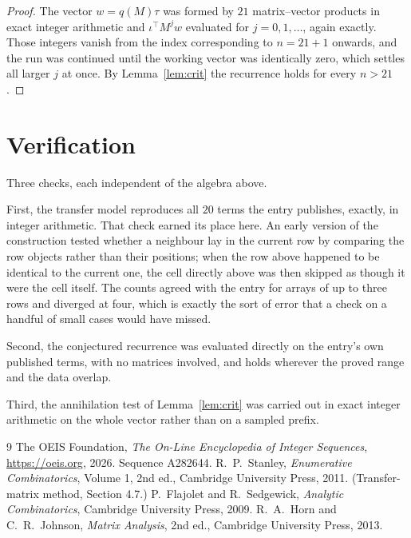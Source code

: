 \documentclass[11pt,a4paper]{article}
\theoremstyle{plain}
\theoremstyle{definition}
\begin{document}
\begin{proof}
The vector $w=q(M)\tau$ was formed by $21$ matrix--vector products in exact integer
arithmetic and $\iota^{\!\top}M^{j}w$ evaluated for $j=0,1,\dots$, again exactly. Those
integers vanish from the index corresponding to $n=21+1$ onwards, and the run was
continued until the working vector was identically zero, which settles all larger $j$ at once.
By Lemma~\ref{lem:crit} the recurrence holds for every $n>21$.
\end{proof}

\section{Verification}

Three checks, each independent of the algebra above.

First, the transfer model reproduces all $20$ terms the entry publishes, exactly, in
integer arithmetic. That check earned its place here. An early version of the construction
tested whether a neighbour lay in the current row by comparing the row objects rather
than their positions; when the row above happened to be identical to the current one, the
cell directly above was then skipped as though it were the cell itself. The counts agreed with
the entry for arrays of up to three rows and diverged at four, which is exactly the sort of
error that a check on a handful of small cases would have missed.

Second, the conjectured recurrence was evaluated directly on the entry's own published terms,
with no matrices involved, and holds wherever the proved range and the data overlap.

Third, the annihilation test of Lemma~\ref{lem:crit} was carried out in exact integer
arithmetic on the whole vector rather than on a sampled prefix.

\begin{thebibliography}{9}
 The OEIS Foundation, \emph{The On-Line Encyclopedia of Integer
Sequences}, \url{https://oeis.org}, 2026. Sequence A282644.
 R.~P.~Stanley, \emph{Enumerative Combinatorics}, Volume 1, 2nd ed.,
Cambridge University Press, 2011. (Transfer-matrix method, Section 4.7.)
 P.~Flajolet and R.~Sedgewick, \emph{Analytic Combinatorics}, Cambridge
University Press, 2009.
 R.~A.~Horn and C.~R.~Johnson, \emph{Matrix Analysis}, 2nd ed., Cambridge
University Press, 2013.
\end{thebibliography}
\end{document}
